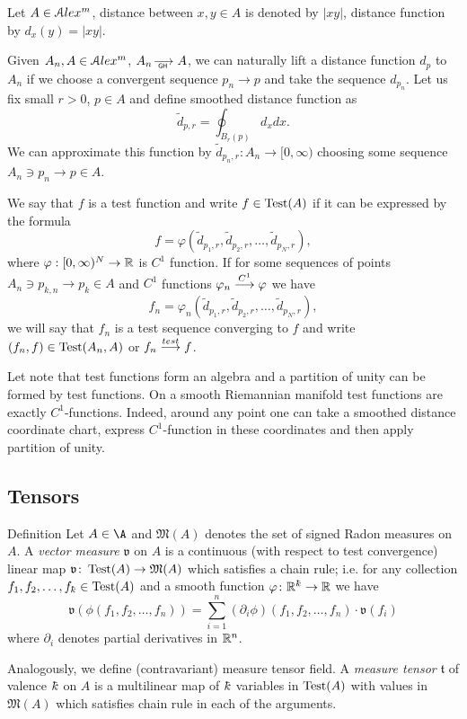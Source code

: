 \documentclass[a4paper,10pt]{article}
\begin{document}
Let $A\in \mathcal{A}lex^m$, distance between $x,y\in A$ is denoted by $|xy|$,
distance function  by $d_x(y)=|xy|$.



Given $A_n, A\in \mathcal{A}lex^m$,  $A_n\GHto A$,
we can naturally lift a distance function $d_p$ to $A_n$
if we choose a convergent sequence $p_n\to p$ and take the
sequence $d_{p_n}$.
Let us fix small $r>0$,
$p\in A$
and define smoothed distance function as $$\widetilde{d}_{p,r} =\oint_{B_r(p)} d_{x}dx.$$ 
We can approximate this function by
$\widetilde{d}_{p_n,r}:A_n\to [0,\infty)  $
 choosing
  some  sequence $A_n\ni p_n\to p\in A$.

We say that $f$ is a test function
and write $f\in \operatorname{Test}(A)$ if it can be expressed by the formula
$$f=\varphi( \widetilde {d}_{p_1,r}, \widetilde{d}_{p_2,r},\dots,   \widetilde{d}_{p_N,r}),$$
where $\varphi:[0,\infty)^N\to\mathbb{R}$ is  $C^1$ function.
If for some sequences of points $A_n\ni p_{k,n}\to p_k\in A$
and $C^1$ functions   
$\varphi_n\stackrel{C^1}{\longrightarrow} \varphi$ we have
$$f_n=\varphi_n( \widetilde {d}_{p_1,r}, \widetilde{d}_{p_2,r},\dots,   \widetilde{d}_{p_N,r}),$$
we will say that $f_n$ is a test sequence converging to $f$ and write
$(f_n,f)\in \operatorname{Test}(A_n,A)$ or $f_n\stackrel{test}{\longrightarrow} f$.

Let note that
test functions form an algebra and a
partition of unity can be formed by test functions.
On a smooth Riemannian manifold test functions
are exactly $C^1$-functions.
Indeed, around any point one can take a
smoothed distance 
coordinate chart, express $C^1$-function in these 
coordinates and then apply partition of unity. 
 
 
\subsection{Tensors}


\begin{rdef} {Definition}\label{def:mestens}
Let $A\in \A$ and $\mathfrak M(A)$
denotes the set of signed Radon measures on $A$.
A \emph{vector measure } $\mathfrak{v}$  on $A$
is a  continuous (with respect to test convergence) linear map
$\mathfrak{v}\colon\operatorname{Test}(A)\to \mathfrak M(A)$ which satisfies a
chain rule;
i.e. for any collection  $f_1,f_2,\dots,f_\kay \in \Test(A)$
and a smooth function $\phi\:\RR^\kay\to\RR$ we have
$$\mathfrak{v}(\phi(f_1,f_2,\dots,f_n))
=
\sum_{i=1}^n (\partial_i\phi)(f_1,f_2,\dots,f_n)\cdot\mathfrak{v}(f_i)$$
where $\partial_i$ denotes partial derivatives in $\mathbb{R}^n$.

Analogously, we define (contravariant) measure tensor field.
A \emph{measure tensor } $\mathfrak{t}$ of valence $\kay$ on $A$ is a multilinear map of $\kay$ variables in $\operatorname{Test}(A)$ with values in $\mathfrak M(A)$ which satisfies chain rule in each of the arguments.


\end{rdef}
\end{document}
